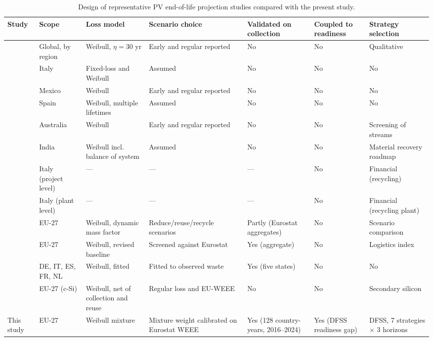\documentclass[a4paper,fleqn]{cas-sc}
\begin{document}
\begin{table}[t]\centering\scriptsize
\caption{Design of representative PV end-of-life projection studies compared with the present study.}
\label{tab:litpv}
\begin{adjustbox}{max width=\linewidth}\begin{tabular}{@{}lp{2.2cm}p{2.4cm}p{2.6cm}p{1.9cm}p{1.9cm}p{2.6cm}@{}}\toprule
Study & Scope & Loss model & Scenario choice & Validated on collection & Coupled to readiness & Strategy selection \\ \midrule
\citet{irena2016} & Global, by region & Weibull, $\eta=30$ yr & Early and regular reported & No & No & Qualitative \\
\citet{paiano2015} & Italy & Fixed-loss and Weibull & Assumed & No & No & No \\
\citet{dominguez2017} & Mexico & Weibull & Early and regular reported & No & No & No \\
\citet{santos2018} & Spain & Weibull, multiple lifetimes & Assumed & No & No & No \\
\citet{mahmoudi2019} & Australia & Weibull & Early and regular reported & No & No & Screening of streams \\
\citet{gautam2021} & India & Weibull incl. balance of system & Assumed & No & No & Material recovery roadmap \\
\citet{cucchiella2015} & Italy (project level) & --- & --- & --- & No & Financial (recycling) \\
\citet{dadamo2023} & Italy (plant level) & --- & --- & --- & No & Financial (recycling plant) \\
\citet{kastanaki2025} & EU-27 & Weibull, dynamic mass factor & Reduce/reuse/recycle scenarios & Partly (Eurostat aggregates) & No & Scenario comparison \\
\citet{kastanaki2026} & EU-27 & Weibull, revised baseline & Screened against Eurostat & Yes (aggregate) & No & Logistics index \\
\citet{pitacco2026} & DE, IT, ES, FR, NL & Weibull, fitted & Fitted to observed waste & Yes (five states) & No & No \\
\citet{nagarajan2026} & EU-27 (c-Si) & Weibull, net of collection and reuse & Regular loss and EU-WEEE & No & No & Secondary silicon \\
This study & EU-27 & Weibull mixture & Mixture weight calibrated on Eurostat WEEE & Yes (128 country-years, 2016--2024) & Yes (DFSS readiness gap) & DFSS, 7 strategies $\times$ 3 horizons \\
\bottomrule\end{tabular}\end{adjustbox}\end{table}
\end{document}

